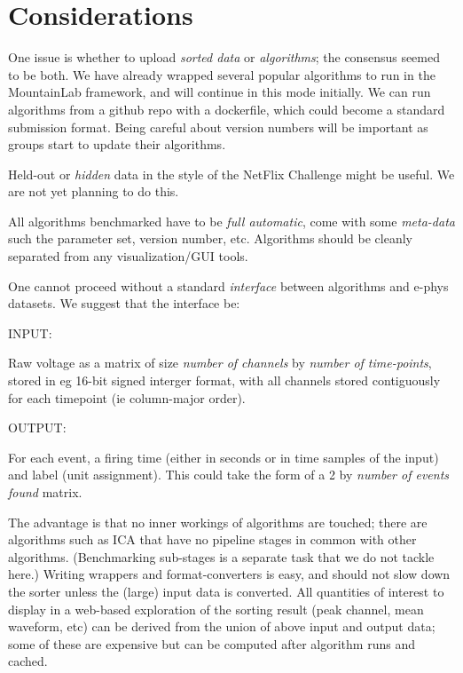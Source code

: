 \documentclass[10pt]{article}
\begin{document}
\section{Considerations}
\label{s:cons}

One issue is whether to upload {\em sorted data} or {\em algorithms};
the consensus seemed to be both.
We have already wrapped several popular algorithms
to run in the MountainLab framework, and will continue in this
mode initially.
We can run algorithms from a github repo with a dockerfile, which
could become a standard submission format.
Being careful about version numbers will be important as groups
start to update their algorithms.

Held-out or {\em hidden} data in the style of the NetFlix Challenge might
be useful.
We are not yet planning to do this.

All algorithms benchmarked have to be {\em full automatic},
come with some {\em meta-data} such the parameter set, version number, etc.
Algorithms should be cleanly separated from any visualization/GUI tools.

One cannot proceed without a
standard {\em interface} between algorithms and e-phys datasets.
We suggest that the interface be:

\vspace{2ex}

\begin{minipage}[t]{1in}INPUT:\end{minipage} \begin{minipage}[t]{5in}
    Raw voltage as a matrix of size {\em number of channels} by
  {\em number of
    time-points}, stored in eg 16-bit signed interger format,
  with all channels stored
  contiguously for each timepoint (ie column-major order).
  \end{minipage}

\begin{minipage}[t]{1in}OUTPUT:\end{minipage} \begin{minipage}[t]{5in}
  For each event, 
  a firing time (either in seconds or in time samples of the input)
  and label (unit assignment).
  This could take the form of a 2 by {\em number of events found} matrix.
\end{minipage}

\vspace{2ex}

The advantage is that no inner workings of algorithms are touched;
there are algorithms such as ICA that have no pipeline stages
in common with other algorithms. (Benchmarking sub-stages is a separate
task that we do not tackle here.)
Writing wrappers and format-converters is easy, and should not
slow down the sorter unless the (large) input data is converted.
All quantities of interest to display in a web-based exploration
of the sorting result (peak channel, mean waveform, etc)
can be derived from the union of above input and output data;
some of these are expensive but can be computed after algorithm runs and cached.
\end{document}
